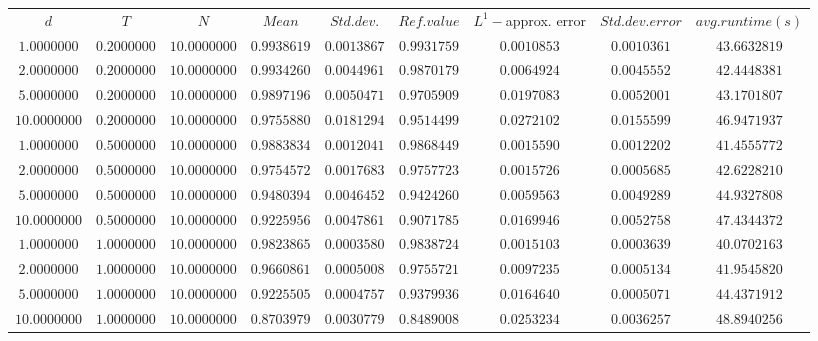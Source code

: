 \begin{tabular}{ccccccccc}
$d$ & $T$ & $N$ & $Mean$ & $Std. dev.$ & $Ref. value$ & $L^1-$approx. error & $Std. dev. error$ & $avg. runtime (s)$\\
$1.0000000$ & $0.2000000$ & $10.0000000$ & $0.9938619$ & $0.0013867$ & $0.9931759$ & $0.0010853$ & $0.0010361$ & $43.6632819$\\
$2.0000000$ & $0.2000000$ & $10.0000000$ & $0.9934260$ & $0.0044961$ & $0.9870179$ & $0.0064924$ & $0.0045552$ & $42.4448381$\\
$5.0000000$ & $0.2000000$ & $10.0000000$ & $0.9897196$ & $0.0050471$ & $0.9705909$ & $0.0197083$ & $0.0052001$ & $43.1701807$\\
$10.0000000$ & $0.2000000$ & $10.0000000$ & $0.9755880$ & $0.0181294$ & $0.9514499$ & $0.0272102$ & $0.0155599$ & $46.9471937$\\
$1.0000000$ & $0.5000000$ & $10.0000000$ & $0.9883834$ & $0.0012041$ & $0.9868449$ & $0.0015590$ & $0.0012202$ & $41.4555772$\\
$2.0000000$ & $0.5000000$ & $10.0000000$ & $0.9754572$ & $0.0017683$ & $0.9757723$ & $0.0015726$ & $0.0005685$ & $42.6228210$\\
$5.0000000$ & $0.5000000$ & $10.0000000$ & $0.9480394$ & $0.0046452$ & $0.9424260$ & $0.0059563$ & $0.0049289$ & $44.9327808$\\
$10.0000000$ & $0.5000000$ & $10.0000000$ & $0.9225956$ & $0.0047861$ & $0.9071785$ & $0.0169946$ & $0.0052758$ & $47.4344372$\\
$1.0000000$ & $1.0000000$ & $10.0000000$ & $0.9823865$ & $0.0003580$ & $0.9838724$ & $0.0015103$ & $0.0003639$ & $40.0702163$\\
$2.0000000$ & $1.0000000$ & $10.0000000$ & $0.9660861$ & $0.0005008$ & $0.9755721$ & $0.0097235$ & $0.0005134$ & $41.9545820$\\
$5.0000000$ & $1.0000000$ & $10.0000000$ & $0.9225505$ & $0.0004757$ & $0.9379936$ & $0.0164640$ & $0.0005071$ & $44.4371912$\\
$10.0000000$ & $1.0000000$ & $10.0000000$ & $0.8703979$ & $0.0030779$ & $0.8489008$ & $0.0253234$ & $0.0036257$ & $48.8940256$\\
\end{tabular}
